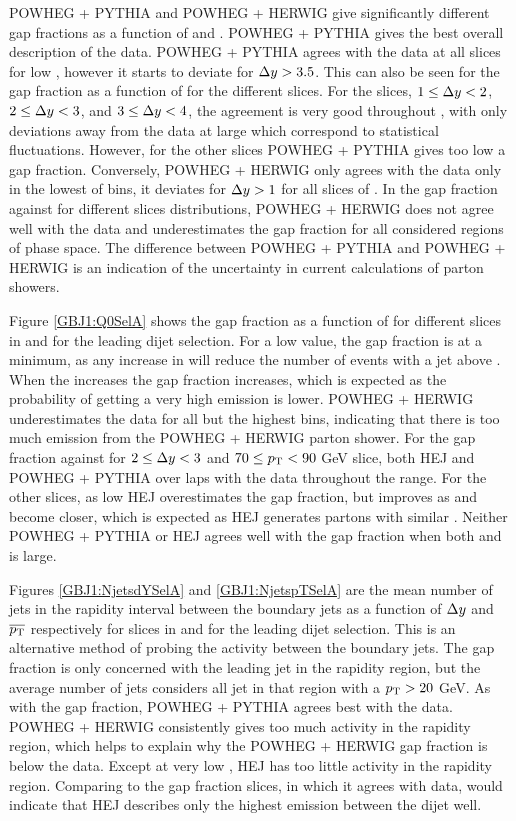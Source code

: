 POWHEG + PYTHIA and POWHEG + HERWIG give significantly different gap fractions as a function of \dy{} and \ptb{}.
POWHEG + PYTHIA gives the best overall description of the data.
POWHEG + PYTHIA agrees with the data at all \ptb{} slices for low \dy{}, however it starts to deviate for $\mbox{$\Delta y$}{}>3.5$. 
This can also be seen for the gap fraction as a function of \ptb{} for the different \dy{} slices. 
For the slices, $1\le\mbox{$\Delta y$}{}<2$, $2\le\mbox{$\Delta y$}{}<3$, and $3\le\mbox{$\Delta y$}{}<4$, the agreement is very good throughout \ptb{}, with only deviations away from the data at large \dy{} which correspond to statistical fluctuations.
However, for the other \dy{} slices POWHEG + PYTHIA gives too low a gap fraction.
Conversely, POWHEG + HERWIG only agrees with the data only in the lowest of \dy{} bins, it deviates for $\mbox{$\Delta y$}{}>1$ for all slices of \ptb{}. 
In the gap fraction against \ptb{} for different \dy{} slices distributions, POWHEG + HERWIG does not agree well with the data and underestimates the gap fraction for all considered regions of phase space.
The difference between POWHEG + PYTHIA and POWHEG + HERWIG is an indication of the uncertainty in current calculations of parton showers.


Figure \ref{GBJ1:Q0SelA} shows the gap fraction as a function of \qz{} for different slices in \dy{} and \ptb{} for the leading \pt{} dijet selection.
For a low \qz{} value, the gap fraction is at a minimum, as any increase in \qz{} will reduce the number of events with a jet above \qz{}.
When the \qz{} increases the gap fraction increases, which is expected as the probability of getting a very high \pt{} emission is lower.
POWHEG + HERWIG underestimates the data for all but the highest \qz{} bins, indicating that there is too much emission from the POWHEG + HERWIG parton shower. 
For the gap fraction against \qz{} for $2\le\mbox{$\Delta y$}{}<3$ and  $70\le\mbox{$p_{\rm T}$}{}<90$ GeV slice, both HEJ and POWHEG + PYTHIA over laps with the data throughout the \qz{} range. 
For the other slices, as low \qz{} HEJ overestimates the gap fraction, but improves as \qz{} and \ptb{} become closer, which is expected as HEJ generates partons with similar \pt{}.
Neither POWHEG + PYTHIA or HEJ agrees well with the gap fraction when both \dy{} and \qz{} is large.



Figures \ref{GBJ1:NjetsdYSelA} and \ref{GBJ1:NjetspTSelA} are the mean number of jets in the rapidity interval between the boundary jets as a function of $\mbox{$\Delta y$}{}$ and $\mbox{$\overline{p_{\rm T}}$}{}$ respectively for slices in \ptb{} and \dy{} for the leading \pt{} dijet selection. 
This is an alternative method of probing the activity between the boundary jets. 
The gap fraction is only concerned with the leading jet in the rapidity region, but the average number of jets considers all jet in that region with a $\mbox{$p_{\rm T}$}{}>20$ GeV. 
As with the gap fraction, POWHEG + PYTHIA agrees best with the data.
POWHEG + HERWIG consistently gives too much activity in the rapidity region, which helps to explain why the POWHEG + HERWIG gap fraction is below the data.
Except at very low \ptb{}, HEJ has too little activity in the rapidity region.
Comparing to the gap fraction slices, in which it agrees with data, would indicate that HEJ describes only the highest \pt{} emission between the dijet well. 

